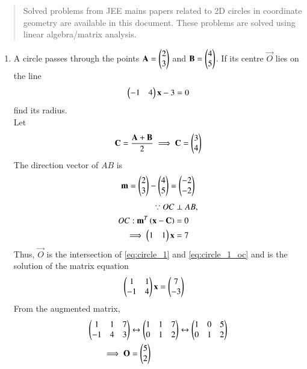\documentclass[journal,12pt,twocolumn]{IEEEtran}
\begin{document}
\begin{abstract}
	Solved problems from JEE mains papers related to 2D circles in coordinate geometry are 
available in this document.  These problems are solved using linear algebra/matrix analysis.
\end{abstract}
\begin{enumerate}[label=\arabic*]
\item A circle passes through the points $\mathbf{A}=\begin{pmatrix}2 \\ 3\end{pmatrix}$ and $\mathbf{B} = \begin{pmatrix}4 \\  5\end{pmatrix}$.  If its centre $\vec{O}$ lies on the 
line
\begin{equation}
\label{eq:circle_1}
\begin{pmatrix}-1 & 4\end{pmatrix}\mathbf{x} - 3 =0
\end{equation}
%
find its radius.
\\
\solution Let 
\begin{align}
\mathbf{C}=\frac{\mathbf{A}+\mathbf{B}}{2}
\implies \mathbf{C}=\begin{pmatrix}3 \\ 4\end{pmatrix}
\label{eq:circle_1_c}
\end{align}
The direction vector of $AB$ is 
\begin{align}
\label{eq:circle_1_m}
\mathbf{m} = \begin{pmatrix}2 \\ 3\end{pmatrix}-\begin{pmatrix}4 \\  5\end{pmatrix}
= \begin{pmatrix}-2 \\ -2\end{pmatrix}
\end{align}
\begin{align}
\because OC &\perp AB,
\nonumber \\
OC: \mathbf{m}^T\left(\mathbf{x}-\mathbf{C}\right)&=0
\nonumber \\
\implies \begin{pmatrix}1 & 1\end{pmatrix}\mathbf{x} &= 7
\label{eq:circle_1_oc}
\end{align}
%
Thus, $\vec{O}$ is the intersection of \eqref{eq:circle_1}
and \eqref{eq:circle_1_oc} and is the solution of the matrix equation
\begin{align}
 \begin{pmatrix}1 & 1 \\ -1 & 4\end{pmatrix}\mathbf{x} &= \begin{pmatrix}7 \\ -3\end{pmatrix}
\label{eq:circle_1_matrix}
\end{align}
%
From the augmented matrix,
\begin{align}
 \myvec{1 & 1 &7\\ -1 & 4 & 3}&\leftrightarrow  \myvec{1 & 1 &7\\ 0 & 1 & 2}\leftrightarrow \myvec{1 & 0 & 5\\ 0 & 1 & 2} 
\nonumber \\
\implies \vec{O} &= \myvec{5 \\ 2}

\end{align}
\end{enumerate}
\end{document}
